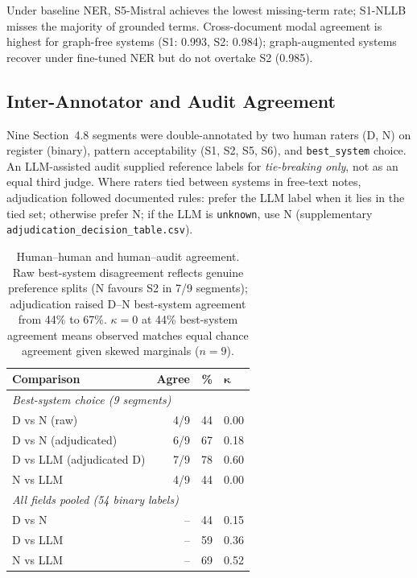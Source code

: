 \documentclass[11pt,a4paper,twocolumn]{article}
\begin{document}
Under baseline NER, S5-Mistral achieves the lowest missing-term rate;
S1-NLLB misses the majority of grounded terms.
Cross-document modal agreement is highest for graph-free systems (S1: 0.993,
S2: 0.984); graph-augmented systems recover under fine-tuned NER but do not
overtake S2 (0.985).

\subsection{Inter-Annotator and Audit Agreement}
\label{sec:interannotator}

Nine Section~4.8 segments were double-annotated by two human raters (D, N)
on register (binary), pattern acceptability (S1, S2, S5, S6), and
\texttt{best\_system} choice.
An LLM-assisted audit supplied reference labels for \emph{tie-breaking only},
not as an equal third judge.
Where raters tied between systems in free-text notes, adjudication followed
documented rules: prefer the LLM label when it lies in the tied set; otherwise
prefer N; if the LLM is \texttt{unknown}, use N
(supplementary \texttt{adjudication\_decision\_table.csv}).

\begin{table}[!t]
\centering
\footnotesize
\setlength{\tabcolsep}{4pt}
\begin{tabular}{lrrl}
\toprule
\textbf{Comparison} & \textbf{Agree} & \textbf{\%} & $\boldsymbol{\kappa}$ \\
\midrule
\multicolumn{4}{l}{\textit{Best-system choice (9 segments)}} \\
\quad D vs N (raw) & 4/9 & 44 & 0.00 \\
\quad D vs N (adjudicated) & 6/9 & 67 & 0.18 \\
\quad D vs LLM (adjudicated D) & 7/9 & 78 & 0.60 \\
\quad N vs LLM & 4/9 & 44 & 0.00 \\
\midrule
\multicolumn{4}{l}{\textit{All fields pooled (54 binary labels)}} \\
\quad D vs N & -- & 44 & 0.15 \\
\quad D vs LLM & -- & 59 & 0.36 \\
\quad N vs LLM & -- & 69 & 0.52 \\
\bottomrule
\end{tabular}
\caption{Human--human and human--audit agreement.
Raw best-system disagreement reflects genuine preference splits (N favours
S2 in 7/9 segments); adjudication raised D--N best-system agreement from
44\% to 67\%.
$\kappa{=}0$ at 44\% best-system agreement means observed matches equal
chance agreement given skewed marginals ($n{=}9$).}
\label{tab:interannotator}
\end{table}
\end{document}
